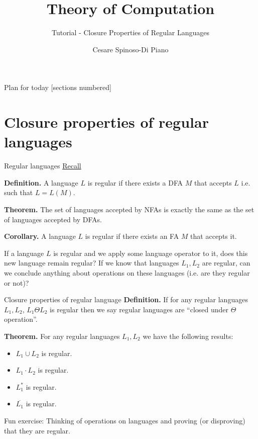 \documentclass[10pt]{beamer}
\title{Theory of Computation}
\subtitle{Tutorial - Closure Properties of Regular Languages}
\author{Cesare Spinoso-Di Piano}
\date{}
\begin{document}
\maketitle

\begin{frame}{Plan for today}
    [sections numbered]
    \tableofcontents[hideallsubsections]
\end{frame}

\section{Closure properties of regular languages}
\begin{frame}{Regular languages}
    \underline{Recall}

    \textbf{Definition.} A language $L$ is regular if there exists a DFA $M$ that accepts $L$ i.e. such that $L = L(M)$.

    \textbf{Theorem.} The set of languages accepted by NFAs is exactly the same as the set of languages accepted by DFAs.

    \textbf{Corollary.} A language $L$ is regular if there exists an FA $M$ that accepts it.

    If a language $L$ is regular and we apply some language operator to it, does this new language remain regular? If we know that languages $L_1, L_2$ are regular, can we conclude anything about operations on these languages (i.e. are they regular or not)?

\end{frame}

\begin{frame}{Closure properties of regular language}
    \textbf{Definition.} If for any regular languages $L_1, L_2$, $L_1 \Theta L_2$ is regular then we say regular languages are ``closed under $\Theta$ operation''.

    \textbf{Theorem.} For any regular languages $L_1, L_2$ we have the following results:\begin{itemize}
        \item $L_1 \cup L_2$ is regular.
        \item $L_1 \cdot L_2$ is regular.
        \item $L_1^*$ is regular.
        \item $\overline{L_1}$ is regular.
    \end{itemize}

    Fun exercise: Thinking of operations on languages and proving (or disproving) that they are regular.
\end{frame}
\end{document}
